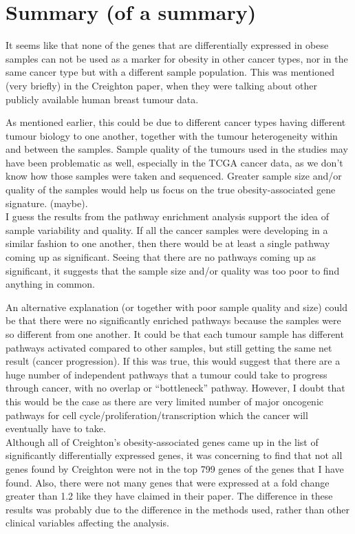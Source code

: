 \documentclass[a4paper, 11pt]{article}
\begin{document}
\section*{Summary (of a summary)}

It seems like that none of the genes that are differentially expressed in obese samples can not be used as a marker for obesity in other cancer types, nor in the same cancer type but with a different sample population.
This was mentioned (very briefly) in the Creighton paper, when they were talking about other publicly available human breast tumour data.

As mentioned earlier, this could be due to different cancer types having different tumour biology to one another, together with the tumour heterogeneity within and between the samples.
Sample quality of the tumours used in the studies may have been problematic as well, especially in the TCGA cancer data, as we don't know how those samples were taken and sequenced.
Greater sample size and/or quality of the samples would help us focus on the true obesity-associated gene signature. (maybe).\\

I guess the results from the pathway enrichment analysis support the idea of sample variability and quality.
If all the cancer samples were developing in a similar fashion to one another, then there would be at least a single pathway coming up as significant.
Seeing that there are no pathways coming up as significant, it suggests that the sample size and/or quality was too poor to find anything in common.

An alternative explanation (or together with poor sample quality and size) could be that there were no significantly enriched pathways because the samples were so different from one another.
It could be that each tumour sample has different pathways activated compared to other samples, but still getting the same net result (cancer progression).
If this was true, this would suggest that there are a huge number of independent pathways that a tumour could take to progress through cancer, with no overlap or ``bottleneck'' pathway.
However, I doubt that this would be the case as there are very limited number of major oncogenic pathways for cell cycle/proliferation/transcription which the cancer will eventually have to take.\\

Although all of Creighton's obesity-associated genes came up in the list of significantly differentially expressed genes, it was concerning to find that not all genes found by Creighton were not in the top 799 genes of the genes that I have found.
Also, there were not many genes that were expressed at a fold change greater than 1.2 like they have claimed in their paper.
The difference in these results was probably due to the difference in the methods used, rather than other clinical variables affecting the analysis.
\end{document}
